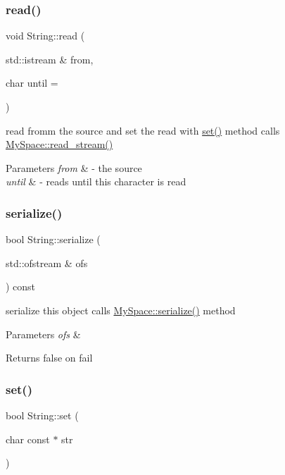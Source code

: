 \subsubsection{\texorpdfstring{read()}{read()}}
{\footnotesize\ttfamily void String\+::read (\begin{DoxyParamCaption}\item[{std\+::istream \&}]{from,  }\item[{char}]{until = {\ttfamily \textquotesingle{}~\textquotesingle{}} }\end{DoxyParamCaption})}

read fromm the source and set the read with \hyperlink{classString_a809addfc91485db4c89baad03ff12b18}{set()} method calls \hyperlink{namespaceMySpace_acfe71ee08c30cdafde43d7db1cd34aff}{My\+Space\+::read\+\_\+stream()} 
\begin{DoxyParams}{Parameters}
{\em from} & -\/ the source \\
\hline
{\em until} & -\/ reads until this character is read \\
\hline
\end{DoxyParams}
\mbox{\label{classString_a05ec329796015f98719b6a924c0f0eb4}} 
\subsubsection{\texorpdfstring{serialize()}{serialize()}}
{\footnotesize\ttfamily bool String\+::serialize (\begin{DoxyParamCaption}\item[{std\+::ofstream \&}]{ofs }\end{DoxyParamCaption}) const}

serialize this object calls \hyperlink{namespaceMySpace_ad2ec85a91c9b7fb281271a88f0ce9ef4}{My\+Space\+::serialize()} method 
\begin{DoxyParams}{Parameters}
{\em ofs} & \\
\hline
\end{DoxyParams}
\begin{DoxyReturn}{Returns}
false on fail 
\end{DoxyReturn}
\mbox{\label{classString_a809addfc91485db4c89baad03ff12b18}} 
\subsubsection{\texorpdfstring{set()}{set()}}
{\footnotesize\ttfamily bool String\+::set (\begin{DoxyParamCaption}\item[{char const $\ast$}]{str }\end{DoxyParamCaption})}


